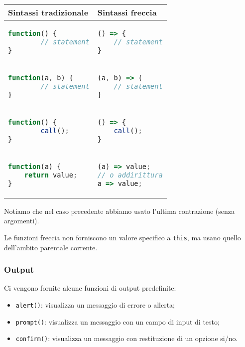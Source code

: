 \documentclass[a4paper,11pt]{article}
\begin{document}
\begin{table}[h!]
	\center {}
\begin{tabular} { p{5cm} | p{5cm} }
		\bfseries Sintassi tradizionale & \bfseries Sintassi freccia \\
		\hline 

\begin{lstlisting}[language=javascript, style=codestyle]	
function() {
		// statement
}
\end{lstlisting} &
\begin{lstlisting}[language=javascript, style=codestyle]	
() => {
	// statement
}
\end{lstlisting} \\

\begin{lstlisting}[language=javascript, style=codestyle]	
function(a, b) {
		// statement
}
\end{lstlisting} &
\begin{lstlisting}[language=javascript, style=codestyle]	
(a, b) => {
	// statement
}
\end{lstlisting} \\

\begin{lstlisting}[language=javascript, style=codestyle]	
function() {
		call();
}
\end{lstlisting} &
\begin{lstlisting}[language=javascript, style=codestyle]	
() => {
	call();
}
\end{lstlisting} \\

\begin{lstlisting}[language=javascript, style=codestyle]	
function(a) {
	return value;
}
\end{lstlisting} &
\begin{lstlisting}[language=javascript, style=codestyle]	
(a) => value; 
// o addirittura
a => value;
\end{lstlisting} \\
	\end{tabular}
\end{table}

Notiamo che nel caso precedente abbiamo usato l'ultima contrazione (senza argomenti). 

Le funzioni freccia non forniscono un valore specifico a \lstinline|this|, ma usano quello dell'ambito parentale corrente.

\subsubsection{Output}
Ci vengono fornite alcune funzioni di output predefinite:
\begin{itemize}
	\item \lstinline|alert()|: visualizza un messaggio di errore o allerta;
	\item \lstinline|prompt()|: visualizza un messaggio con un campo di input di testo;
	\item \lstinline|confirm()|: visualizza un messaggio con restituzione di un opzione si/no.
\end{itemize}
\end{document}
